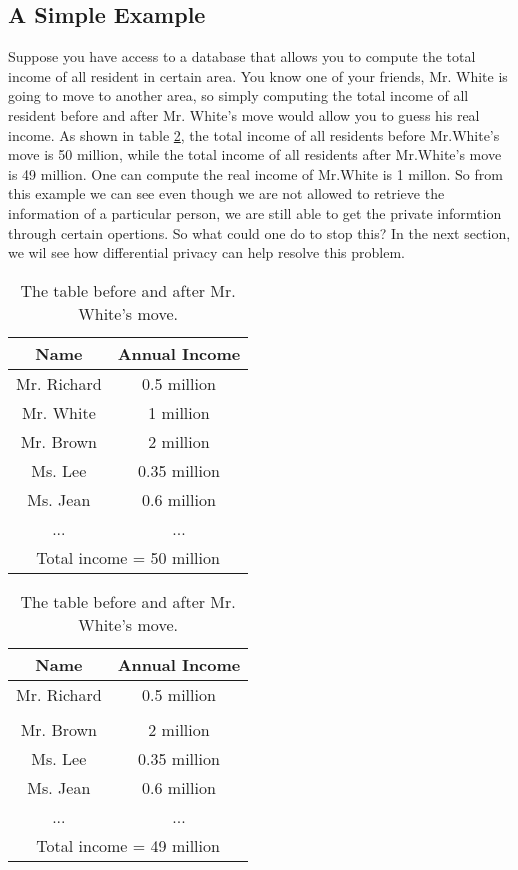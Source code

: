 \documentclass[a4paper, 11pt]{article} %
\begin{document}
\subsection{A Simple Example}
Suppose you have access to a database that allows you to compute the total income of all resident in certain area. You know one of your friends, Mr. White is going to move to another area, so simply computing the total income of all resident before and after Mr. White's move would allow you to guess his real income. As shown in table \ref{table:1}, the total income of all residents before Mr.White's move is 50 million, while the total income of all residents after Mr.White's move is 49 million. One can compute the real income of Mr.White is 1 millon. So from this example we can see even though we are not allowed to retrieve the information of a particular person, we are still able to get the private informtion through certain opertions. So what could one do to stop this? In the next section, we wil see how differential privacy can help resolve this problem.


\begin{table}
	\begin{tabular}{||c||c||} 
		\hline
		Name & Annual Income  \\ [0.5ex] 
		\hline\hline
		Mr. Richard & 0.5 million  \\ 
		\hline
		Mr. White & 1 million \\
		\hline
		Mr. Brown & 2 million \\
		\hline
		Ms. Lee & 0.35 million \\
		\hline
		Ms. Jean & 0.6 million \\
		\hline
		... & ...  \\
		\hline
		\multicolumn{2}{||c||}{Total income = 50 million}\\
		\hline
	\end{tabular}
\quad\quad
\begin{tabular}{||c || c||} 
	\hline
	Name & Annual Income  \\ [0.5ex] 
	\hline\hline
	Mr. Richard & 0.5 million  \\ 
	\hline
      &  \\
	\hline
	Mr. Brown & 2 million \\
	\hline
	Ms. Lee & 0.35 million \\
	\hline
	Ms. Jean & 0.6 million \\
	\hline
	... & ...  \\
	\hline
	\multicolumn{2}{||c||}{Total income = 49 million}\\
	\hline
\end{tabular}
	\caption{The table before and after Mr. White's move. }
	\label{table:1}
\end{table}
\end{document}
